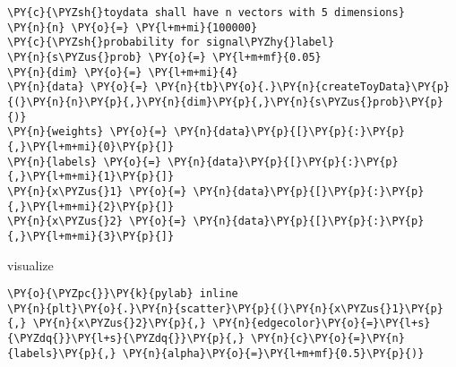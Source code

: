 {\par%
\vspace{-1\baselineskip}%
}%
\begin{notebookcell}[]%
\begin{addmargin}[\cellleftmargin]{0em}%
{\smaller%
\par%
%
\vspace{-1\smallerfontscale}%
\begin{Verbatim}[commandchars=\\\{\}]
\PY{c}{\PYZsh{}toydata shall have n vectors with 5 dimensions}
\PY{n}{n} \PY{o}{=} \PY{l+m+mi}{100000}
\PY{c}{\PYZsh{}probability for signal\PYZhy{}label}
\PY{n}{s\PYZus{}prob} \PY{o}{=} \PY{l+m+mf}{0.05}
\PY{n}{dim} \PY{o}{=} \PY{l+m+mi}{4}
\PY{n}{data} \PY{o}{=} \PY{n}{tb}\PY{o}{.}\PY{n}{createToyData}\PY{p}{(}\PY{n}{n}\PY{p}{,}\PY{n}{dim}\PY{p}{,}\PY{n}{s\PYZus{}prob}\PY{p}{)}
\PY{n}{weights} \PY{o}{=} \PY{n}{data}\PY{p}{[}\PY{p}{:}\PY{p}{,}\PY{l+m+mi}{0}\PY{p}{]}
\PY{n}{labels} \PY{o}{=} \PY{n}{data}\PY{p}{[}\PY{p}{:}\PY{p}{,}\PY{l+m+mi}{1}\PY{p}{]}
\PY{n}{x\PYZus{}1} \PY{o}{=} \PY{n}{data}\PY{p}{[}\PY{p}{:}\PY{p}{,}\PY{l+m+mi}{2}\PY{p}{]}
\PY{n}{x\PYZus{}2} \PY{o}{=} \PY{n}{data}\PY{p}{[}\PY{p}{:}\PY{p}{,}\PY{l+m+mi}{3}\PY{p}{]}
\end{Verbatim}
%
\par%
\vspace{-1\smallerfontscale}}%
\end{addmargin}
\end{notebookcell}


    visualize


{\par%
\vspace{-1\baselineskip}%
}%
\begin{notebookcell}[]%
\begin{addmargin}[\cellleftmargin]{0em}%
{\smaller%
\par%
%
\vspace{-1\smallerfontscale}%
\begin{Verbatim}[commandchars=\\\{\}]
\PY{o}{\PYZpc{}}\PY{k}{pylab} inline
\PY{n}{plt}\PY{o}{.}\PY{n}{scatter}\PY{p}{(}\PY{n}{x\PYZus{}1}\PY{p}{,} \PY{n}{x\PYZus{}2}\PY{p}{,} \PY{n}{edgecolor}\PY{o}{=}\PY{l+s}{\PYZdq{}}\PY{l+s}{\PYZdq{}}\PY{p}{,} \PY{n}{c}\PY{o}{=}\PY{n}{labels}\PY{p}{,} \PY{n}{alpha}\PY{o}{=}\PY{l+m+mf}{0.5}\PY{p}{)}
\end{Verbatim}
%
\par%
\vspace{-1\smallerfontscale}}%
\end{addmargin}
\end{notebookcell}

